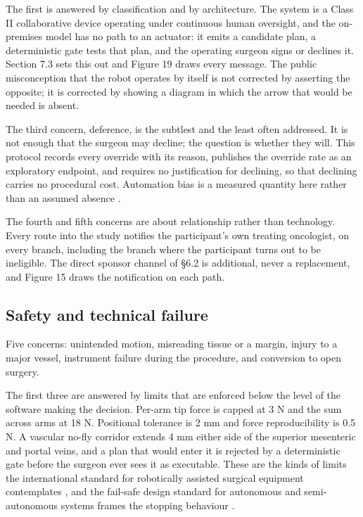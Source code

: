 The first is answered by classification and by architecture. The system is a
Class II collaborative device operating under continuous human oversight, and
the on-premises model has no path to an actuator: it emits a candidate plan, a
deterministic gate tests that plan, and the operating surgeon signs or declines
it. Section 7.3 sets this out and Figure 19 draws every message. The public
misconception that the robot operates by itself \cite{BrarRAS2024X} is not
corrected by asserting the opposite; it is corrected by showing a diagram in
which the arrow that would be needed is absent.

The third concern, deference, is the subtlest and the least often addressed. It
is not enough that the surgeon may decline; the question is whether they will.
This protocol records every override with its reason, publishes the override
rate as an exploratory endpoint, and requires no justification for declining, so
that declining carries no procedural cost. Automation bias is a measured
quantity here rather than an assumed absence \cite{FDATrans2024}.

The fourth and fifth concerns are about relationship rather than technology.
Every route into the study notifies the participant's own treating oncologist,
on every branch, including the branch where the participant turns out to be
ineligible. The direct sponsor channel of \S6.2 is additional, never a
replacement, and Figure 15 draws the notification on each path.

\subsection{Safety and technical failure}

Five concerns: unintended motion, misreading tissue or a margin, injury to a
major vessel, instrument failure during the procedure, and conversion to open
surgery.

The first three are answered by limits that are enforced below the level of the
software making the decision. Per-arm tip force is capped at 3 N and the sum
across arms at 18 N. Positional tolerance is 2 mm and force reproducibility is
0.5 N. A vascular no-fly corridor extends 4 mm either side of the superior
mesenteric and portal veins, and a plan that would enter it is rejected by a
deterministic gate before the surgeon ever sees it as executable. These are the
kinds of limits the international standard for robotically assisted surgical
equipment contemplates \cite{iec8060127}, and the fail-safe design standard for
autonomous and semi-autonomous systems frames the stopping behaviour
\cite{ieee7009}.

